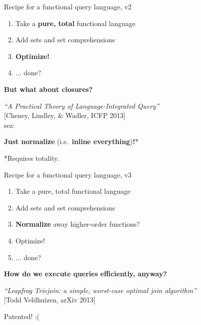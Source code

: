 \documentclass[xcolor=table,usenames,dvipsnames,svgnames]{beamer}
\begin{document}

\begin{frame}{Recipe for a functional query language, v2}\Large
  \begin{enumerate}\itemsep 1.5em
  \item Take a \textbf{pure, total} functional language
  \item Add sets and set comprehensions
  \item {\bf Optimize!}
  \item {\color{red} ... done?}
  \end{enumerate}
\end{frame}


\begin{frame}\centering\huge\bfseries But what about closures?\end{frame}

\begin{frame}\Large
  \emph{``A Practical Theory of Language-Integrated Query''}
  \\[.2em]\large
  [Cheney, Lindley, \& Wadler, ICFP 2013]\\[.1em]
  sez:

  \vspace{.5em}
  \centering\Large {\bfseries Just normalize} (i.e.\ \textbf{inline everything})\textbf{!}*

  \vspace{.5em}\large
  *Requires totality.
\end{frame}


\begin{frame}{Recipe for a functional query language, v3}\Large
  \begin{enumerate}\itemsep 1.5em
  \item Take a pure, total functional language
  \item Add sets and set comprehensions
  \item {\bfseries Normalize} away higher-order functions?
  \item Optimize!
  \item {\color{red} ... done?}
  \end{enumerate}
\end{frame}

\begin{frame}
  \centering\huge\bfseries How do we execute queries efficiently, anyway?
\end{frame}

\begin{frame}
  \Large
  \emph{``Leapfrog Triejoin: a simple, worst-case optimal join algorithm''}
  \\[.2em]\large
  [Todd Veldhuizen, arXiv 2013]

  \pause\vspace{1em}
  \huge\centering\color{red} Patented! :(
\end{frame}
\end{document}

